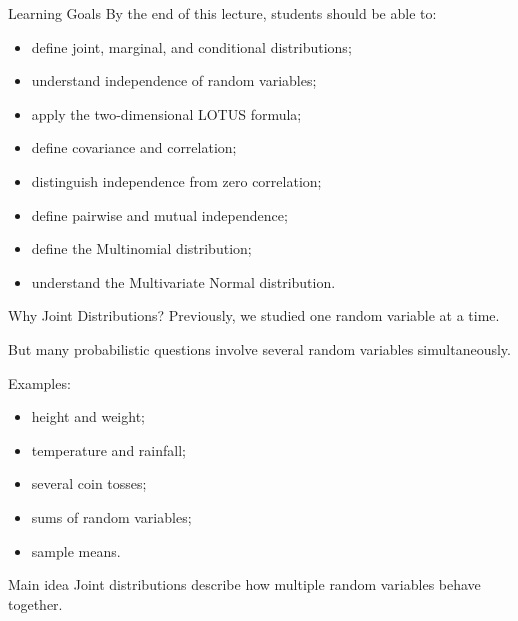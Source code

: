 \setcounter{framenumber}{0}

\begin{frame}
  \titlepage
\end{frame}

\begin{frame}{Learning Goals}
By the end of this lecture, students should be able to:
\begin{itemize}
    \item define joint, marginal, and conditional distributions;
    \item understand independence of random variables;
    \item apply the two-dimensional LOTUS formula;
    \item define covariance and correlation;
    \item distinguish independence from zero correlation;
    \item define pairwise and mutual independence;
    \item define the Multinomial distribution;
    \item understand the Multivariate Normal distribution.
\end{itemize}
\end{frame}


\begin{frame}{Why Joint Distributions?}
Previously, we studied one random variable at a time.

\vspace{0.25cm}

But many probabilistic questions involve several random variables simultaneously.

\vspace{0.25cm}

Examples:
\begin{itemize}
    \item height and weight;
    \item temperature and rainfall;
    \item several coin tosses;
    \item sums of random variables;
    \item sample means.
\end{itemize}

\vspace{0.25cm}

\begin{keybox}{Main idea}
Joint distributions describe how multiple random variables behave together.
\end{keybox}
\end{frame}

